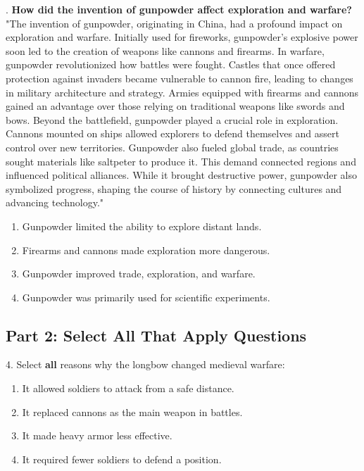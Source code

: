 \documentclass[12pt]{article}
\begin{document}
\vspace{1cm}
. \textbf{How did the invention of gunpowder affect exploration and warfare?\\}
"The invention of gunpowder, originating in China, had a profound impact on \\exploration and warfare. Initially used for fireworks, gunpowder’s explosive power soon led to the creation of weapons like cannons and firearms. In warfare, gunpowder revolutionized how battles were fought. Castles that once offered protection against invaders became vulnerable to cannon fire, leading to changes in military architecture and strategy. Armies equipped with firearms and cannons gained an advantage over those relying on traditional weapons like swords and bows. Beyond the battlefield, gunpowder played a crucial role in exploration. Cannons mounted on ships allowed explorers to defend themselves and assert control over new territories. Gunpowder also fueled global trade, as countries sought materials like saltpeter to produce it. This demand connected regions and influenced political alliances. While it brought destructive power, gunpowder also symbolized progress, shaping the course of history by connecting cultures and advancing technology."\\
\begin{enumerate}[label=\Alph*.]
    \item Gunpowder limited the ability to explore distant lands.  
    \item Firearms and cannons made exploration more dangerous.  
    \item Gunpowder improved trade, exploration, and warfare.  
    \item Gunpowder was primarily used for scientific experiments.  
\end{enumerate}


\vspace{1cm}

\newpage
\subsection*{Part 2: Select All That Apply Questions}

4. Select \textbf{all} reasons why the longbow changed medieval warfare:\\
\begin{enumerate}[label=\Alph*.]
    \item It allowed soldiers to attack from a safe distance.  
    \item It replaced cannons as the main weapon in battles.  
    \item It made heavy armor less effective.  
    \item It required fewer soldiers to defend a position.  
\end{enumerate}
\end{document}
